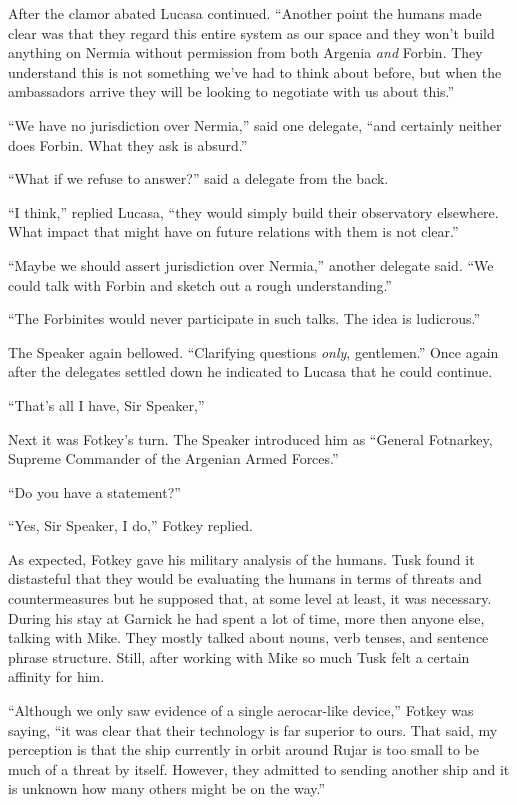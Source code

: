 After the clamor abated Lucasa continued. ``Another point the humans made clear was that they
regard this entire system as our space and they won't build anything on Nermia without
permission from both Argenia \emph{and} Forbin. They understand this is not something we've had
to think about before, but when the ambassadors arrive they will be looking to negotiate with us
about this.''

``We have no jurisdiction over Nermia,'' said one delegate, ``and certainly neither does
Forbin. What they ask is absurd.''

``What if we refuse to answer?'' said a delegate from the back.

``I think,'' replied Lucasa, ``they would simply build their observatory elsewhere. What impact
that might have on future relations with them is not clear.''

``Maybe we should assert jurisdiction over Nermia,'' another delegate said. ``We could talk
with Forbin and sketch out a rough understanding.''

``The Forbinites would never participate in such talks. The idea is ludicrous.''

The Speaker again bellowed. ``Clarifying questions \emph{only}, gentlemen.'' Once again after
the delegates settled down he indicated to Lucasa that he could continue.

``That's all I have, Sir Speaker,''

Next it was Fotkey's turn. The Speaker introduced him as ``General Fotnarkey, Supreme Commander
of the Argenian Armed Forces.''

``Do you have a statement?''

``Yes, Sir Speaker, I do,'' Fotkey replied.

As expected, Fotkey gave his military analysis of the humans. Tusk found it distasteful that
they would be evaluating the humans in terms of threats and countermeasures but he supposed
that, at some level at least, it was necessary. During his stay at Garnick he had spent a lot of
time, more then anyone else, talking with Mike. They mostly talked about nouns, verb tenses, and
sentence phrase structure. Still, after working with Mike so much Tusk felt a certain affinity
for him.

``Although we only saw evidence of a single aerocar-like device,'' Fotkey was saying, ``it was
clear that their technology is far superior to ours. That said, my perception is that the ship
currently in orbit around Rujar is too small to be much of a threat by itself. However, they
admitted to sending another ship and it is unknown how many others might be on the way.''

